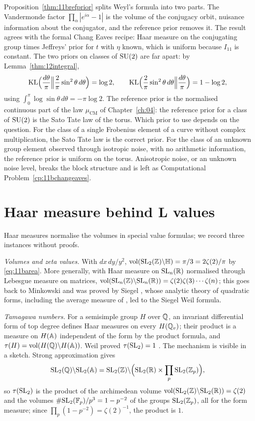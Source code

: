Proposition~\ref{thm:11brefprior} splits Weyl's formula into two parts. The Vandermonde factor $\prod_\alpha|e^{i\alpha}-1|$ is the volume of the conjugacy orbit, nuisance information about the conjugator, and the reference prior removes it. The result agrees with the formal Chang Eaves recipe: Haar measure on the conjugating group times Jeffreys' prior for $t$ with $\eta$ known, which is uniform because $I_{11}$ is constant. The two priors on classes of $\mathrm{SU}(2)$ are far apart: by Lemma~\ref{thm:12integral},
\[
\mathrm{KL}\Bigl(\frac{d\theta}{\pi}\Big\|\frac2\pi\sin^2\theta\,d\theta\Bigr)=\log2,\qquad\mathrm{KL}\Bigl(\frac2\pi\sin^2\theta\,d\theta\Big\|\frac{d\theta}{\pi}\Bigr)=1-\log2,
\]
using $\int_0^\pi\log\sin\theta\,d\theta=-\pi\log2$. The reference prior is the normalised continuous part of the law $\mu_{\mathrm{CM}}$ of Chapter~\ref{ch:04}: the reference prior for a class of $\mathrm{SU}(2)$ is the Sato Tate law of the torus. Which prior to use depends on the question. For the class of a single Frobenius element of a curve without complex multiplication, the Sato Tate law is the correct prior. For the class of an unknown group element observed through isotropic noise, with no arithmetic information, the reference prior is uniform on the torus. Anisotropic noise, or an unknown noise level, breaks the block structure and is left as Computational Problem~\ref{cp:11bchangeaves}.

\section{Haar measure behind L values}\label{sec:11btamagawa}

Haar measures normalise the volumes in special value formulas; we record three instances without proofs.

\emph{Volumes and zeta values.} With $dx\,dy/y^2$, $\operatorname{vol}(\mathrm{SL}_2(\mathbb{Z})\backslash\mathbb H)=\pi/3=2\zeta(2)/\pi$ by \eqref{eq:11barea}. More generally, with Haar measure on $\mathrm{SL}_n(\mathbb{R})$ normalised through Lebesgue measure on matrices, $\operatorname{vol}(\mathrm{SL}_n(\mathbb{Z})\backslash\mathrm{SL}_n(\mathbb{R}))=\zeta(2)\zeta(3)\cdots\zeta(n)$; this goes back to Minkowski and was proved by Siegel \cite{siegel1945}, whose analytic theory of quadratic forms, including the average measure of \cite{siegel1944}, led to the Siegel Weil formula.

\emph{Tamagawa numbers.} For a semisimple group $H$ over $\mathbb{Q}$, an invariant differential form of top degree defines Haar measures on every $H(\mathbb{Q}_v)$; their product is a measure on $H(\mathbb{A})$ independent of the form by the product formula, and $\tau(H)=\operatorname{vol}(H(\mathbb{Q})\backslash H(\mathbb{A}))$. Weil proved $\tau(\mathrm{SL}_2)=1$ \cite{weil1961}. The mechanism is visible in a sketch. Strong approximation gives
\[
\mathrm{SL}_2(\mathbb{Q})\backslash\mathrm{SL}_2(\mathbb{A})=\mathrm{SL}_2(\mathbb{Z})\backslash\Bigl(\mathrm{SL}_2(\mathbb{R})\times\prod_p\mathrm{SL}_2(\mathbb{Z}_p)\Bigr),
\]
so $\tau(\mathrm{SL}_2)$ is the product of the archimedean volume $\operatorname{vol}(\mathrm{SL}_2(\mathbb{Z})\backslash\mathrm{SL}_2(\mathbb{R}))=\zeta(2)$ and the volumes $\#\mathrm{SL}_2(\mathbb F_p)/p^3=1-p^{-2}$ of the groups $\mathrm{SL}_2(\mathbb{Z}_p)$, all for the form measure; since $\prod_p(1-p^{-2})=\zeta(2)^{-1}$, the product is $1$.

